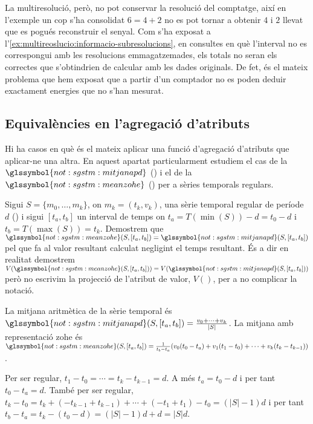 La multiresolució, però, no pot conservar la resolució del comptatge,
així en l'exemple un cop s'ha consolidat $6=4+2$ no es pot tornar a
obtenir $4$ i $2$ llevat que es pogués reconstruir el senyal.  Com
s'ha exposat a
l'\autoref{ex:multireoslucio:informacio-subresolucions}, en consultes
en què l'interval no es correspongui amb les resolucions
emmagatzemades, els totals no seran els correctes que s'obtindrien de
calcular amb les dades originals.  De fet, és el mateix problema que
hem exposat que a partir d'un comptador no es poden deduir exactament
energies que no s'han mesurat.








\subsection{Equivalències en l'agregació d'atributs}

Hi ha casos en què és el mateix aplicar una funció d'agregació
d'atributs que aplicar-ne una altra. En aquest apartat particularment
estudiem el cas de la $\glssymbol{not:sgstm:mitjanapd}$
() i el de la
$\glssymbol{not:sgstm:meanzohe}$ ()
per a sèries temporals regulars.

Sigui $S=\{m_0,\dotsc,m_k\}$, on $m_k=(t_k,v_k)$, una sèrie temporal
regular de període $d$ () i sigui $[t_a,t_b]$
un interval de temps on $t_a=T(\min(S))-d=t_0-d$ i
$t_b=T(\max(S))=t_k$.  Demostrem que
$\glssymbol{not:sgstm:meanzohe}(S,[t_a,t_b]) =
\glssymbol{not:sgstm:mitjanapd}(S,[t_a,t_b])$ pel que fa al valor
resultant calculat negligint el temps resultant. És a dir en realitat demostrem
$V(\glssymbol{not:sgstm:meanzohe}(S,[t_a,t_b])) =
V(\glssymbol{not:sgstm:mitjanapd}(S,[t_a,t_b]))$ però no escrivim la
projecció de l'atribut de valor, $V()$, per a no complicar la notació.

La mitjana aritmètica de la sèrie temporal és
$\glssymbol{not:sgstm:mitjanapd}(S,[t_a,t_b])=\frac{v_0+\dotsb+v_k}{|S|}$.
%
La mitjana amb representació \gls{zohe} és
$\glssymbol{not:sgstm:meanzohe}(S,[t_a,t_b])= \frac{1}{t_b-t_a} (
v_0(t_0-t_a)+v_1(t_1-t_0)+\dotsb+ v_k(t_k-t_{k-1}) )$.

Per ser regular, $t_1-t_0 = \dotsb = t_k-t_{k-1} = d$. A més
$t_a=t_0-d$ i per tant $t_0-t_a = d$. També per ser regular, $t_k-t_0=
t_k +(- t_{k-1} + t_{k-1}) + \dotsb + (- t_1 + t_1) - t_0 = (|S|-1)d$
i per tant $t_b-t_a=t_k - (t_0 - d) = (|S|-1)d +d = |S|d$.

